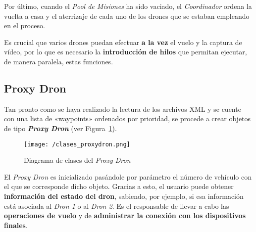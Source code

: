 Por último, cuando el \textit{Pool de Misiones} ha sido vaciado, el \textit{Coordinador} ordena la vuelta a casa y el aterrizaje de cada uno de los drones que se estaban empleando en el proceso.

Es crucial que varios drones puedan efectuar \textbf{a la vez} el vuelo y la captura de vídeo, por lo que es necesario la \textbf{introducción de hilos} que permitan ejecutar, de manera paralela, estas funciones.

\subsection{Proxy Dron}
\label{sec:proxydron}

Tan pronto como se haya realizado la lectura de los archivos XML y se cuente con una lista de «waypoints» ordenados por prioridad, se procede a crear objetos de tipo \textbf{\textit{Proxy Dron}} (ver Figura~\ref{fig:diagclasesproxy}). 

\begin{figure}[!h]
\begin{center}
\texttt{[image: /clases\_proxydron.png]}
\caption[Diagrama de clases del \textit{Proxy Dron}]{Diagrama de clases del \textit{Proxy Dron}}
\label{fig:diagclasesproxy}
\end{center}
\end{figure}

El \textit{Proxy Dron} es inicializado pasándole por parámetro el número de vehículo con el que se corresponde dicho objeto. Gracias a esto, el usuario puede obtener \textbf{información del estado del dron}, sabiendo, por ejemplo, si esa información está asociada al \textit{Dron 1} o al \textit{Dron 2}. Es el responsable de llevar a cabo las \textbf{operaciones de vuelo} y de \textbf{administrar la conexión con los dispositivos finales}.

